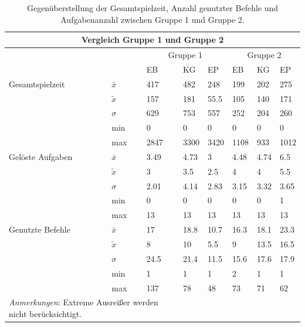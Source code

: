 \begin{table}[htbp]
\centering
\caption{Gegenüberstellung der Gesamtspielzeit, Anzahl genutzter Befehle und Aufgabenanzahl zwischen Gruppe 1 und Gruppe 2.}
\begin{tabular}{ p{3.5cm} | p{0.75cm} | p{1cm} p{1cm}  p{1cm} || p{1cm} p{1cm} p{1cm}}
 \hline
 \multicolumn{8}{c}{Vergleich Gruppe 1 und Gruppe 2} \\
 \hline
 & & \multicolumn{3}{c||}{Gruppe 1} & \multicolumn{3}{c}{Gruppe 2}\\
 & & EB & KG & EP & EB & KG & EP\\
 \hline
  Gesamtspielzeit   & $\bar{x}$     & 417   & 482   & 248   & 199  & 202  & 275   \\
                    & $\tilde{x}$   & 157   & 181   & 55.5  & 105  & 140  & 171   \\
                    & $\sigma$      & 629   & 753   & 557   & 252  & 204  & 260   \\
                    & min           & 0     & 0     & 0     & 0    & 0    & 0     \\
                    & max           & 2847  & 3300  & 3420  & 1108 & 933  & 1012  \\
 \hline
  Gelöste Aufgaben  & $\bar{x}$     & 3.49  & 4.73  & 3     & 4.48 & 4.74   & 6.5     \\
                    & $\tilde{x}$   & 3     & 3.5   & 2.5   & 4    & 4      & 5.5     \\
                    & $\sigma$      & 2.01  & 4.14  & 2.83  & 3.15 & 3.32   & 3.65     \\
                    & min           & 0     & 0     & 0     & 0    & 0      & 1     \\
                    & max           & 13    & 13    & 13    & 13   & 13     & 13     \\
  \hline
  Genutzte Befehle  & $\bar{x}$     & 17   & 18.8   & 10.7  & 16.3   & 18.1   & 23.3     \\
                    & $\tilde{x}$   & 8    & 10     & 5.5   & 9      & 13.5   & 16.5     \\
                    & $\sigma$      & 24.5 & 21.4   & 11.5  & 15.6   & 17.6   & 17.9     \\
                    & min           & 1    & 1      & 1     & 2      & 1      & 1     \\
                    & max           & 137  & 78     & 48    & 73     & 71     & 62     \\

  
 \hline
 \multicolumn{3}{l}{%
 \small%
\textit{Anmerkungen}: Extreme Ausreißer werden nicht berücksichtigt.
}\\
\end{tabular}
\label{final}
\end{table}


